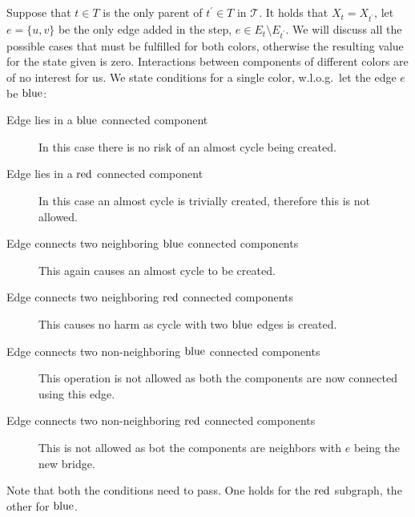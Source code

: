 \subsection{\IntroduceEdgeNode}

Suppose that \( t \in T \) is
the only parent of \( t^\prime \in T \) in \( \mathcal {T} \).
It holds that \( X_t = X_{t^\prime} \),
let \( e = \{u, v\} \) be the only edge added in the step, \( e \in E_t \setminus E_{t^\prime} \).
We will discuss all the possible cases that must be fulfilled for both colors,
otherwise the resulting value for the state given is zero.
Interactions between components of different colors are of no interest for us.
We state conditions for a single color, w.l.o.g.\ let the edge \( e \) be \( \text{blue} \):
%
\begin{description}
	\item[Edge lies in a \( \text{blue} \) connected component]
	      In this case there is no risk of an almost cycle being created.
	\item[Edge lies in a \( \text{red} \) connected component]
	      In this case an almost cycle is trivially created,
	      therefore this is not allowed.
	\item[Edge connects two neighboring \( \text{blue} \) connected components]
	      This again causes an almost cycle to be created.
	\item[Edge connects two neighboring \( \text{red} \) connected components]
	      This causes no harm as cycle with two \( \text{blue} \) edges is created.
	\item[Edge connects two non-neighboring \( \text{blue} \) connected components]
	      This operation is not allowed as both the components
	      are now connected using this edge.
	\item[Edge connects two non-neighboring \( \text{red} \) connected components]
	      This is not allowed as bot the components
	      are neighbors with \( e \) being the new bridge.
\end{description}
%
Note that both the conditions need to pass.
One holds for the \( \text{red} \) subgraph, the other for \( \text{blue} \).

